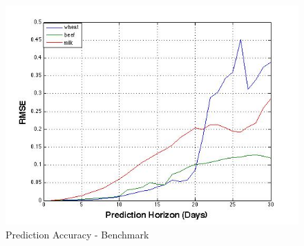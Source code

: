 \begin{figure}[H]
        \centering
         \includegraphics[width=1\textwidth ]{img/model/prediction_days_1}      
        \caption{Prediction Accuracy - Benchmark }
        \label{fig:gnn_fuzz}
\end{figure}









